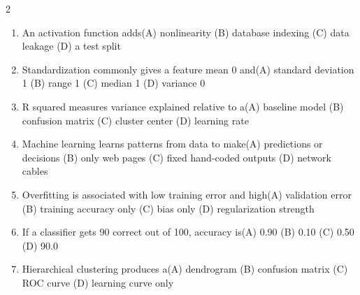 \documentclass[a4paper]{article}
\begin{document}
\begin{multicols*}{2}
\begin{enumerate}[resume]
\item An activation function adds\newline\hspace*{0.6em}(A) nonlinearity \quad (B) database indexing \newline\hspace*{0.6em}(C) data leakage \quad (D) a test split
\item Standardization commonly gives a feature mean 0 and\newline\hspace*{0.6em}(A) standard deviation 1 \quad (B) range 1 \newline\hspace*{0.6em}(C) median 1 \quad (D) variance 0
\item R squared measures variance explained relative to a\newline\hspace*{0.6em}(A) baseline model \quad (B) confusion matrix \newline\hspace*{0.6em}(C) cluster center \quad (D) learning rate
\item Machine learning learns patterns from data to make\newline\hspace*{0.6em}(A) predictions or decisions \quad (B) only web pages \newline\hspace*{0.6em}(C) fixed hand-coded outputs \quad (D) network cables
\item Overfitting is associated with low training error and high\newline\hspace*{0.6em}(A) validation error \quad (B) training accuracy only \newline\hspace*{0.6em}(C) bias only \quad (D) regularization strength
\item If a classifier gets 90 correct out of 100, accuracy is\newline\hspace*{0.6em}(A) 0.90 \quad (B) 0.10 \newline\hspace*{0.6em}(C) 0.50 \quad (D) 90.0
\item Hierarchical clustering produces a\newline\hspace*{0.6em}(A) dendrogram \quad (B) confusion matrix \newline\hspace*{0.6em}(C) ROC curve \quad (D) learning curve only

\end{enumerate}
\end{multicols*}
\end{document}
